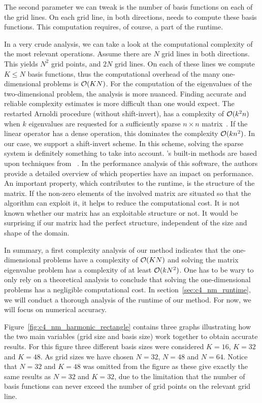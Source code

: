 The second parameter we can tweak is the number of basis functions on each of the grid lines. On each grid line, in both directions, \matslise{} needs to compute these basis functions. This computation requires, of course, a part of the runtime.

In a very crude analysis, we can take a look at the computational complexity of the most relevant operations. Assume there are $N$ grid lines in both directions. This yields $N^2$ grid points, and $2N$ grid lines. On each of these lines we compute $K \leq N$ basis functions, thus the computational overhead of the many one-dimensional problems is $\operatorname{\mathcal{O}}(K N)$. For the computation of the eigenvalues of the two-dimensional problem, the analysis is more nuanced. Finding accurate and reliable complexity estimates is more difficult than one would expect. The restarted Arnoldi procedure (without shift-invert), has a complexity of $\operatorname{\mathcal{O}}(k^2 n)$ when $k$ eigenvalues are requested for a sufficiently sparse $n \times n$ matrix~\cite{lee_k2n_2009}. If the linear operator has a dense operation, this dominates the complexity $\operatorname{\mathcal{O}}(k n^2)$. In our case, we support a shift-invert scheme. In this scheme, solving the sparse system is definitely something to take into account. \Eigen{}'s built-in methods are based upon techniques from \superlu{}~\cite{demmel_supernodal_1999,li_overview_2005}. In the performance analysis of this software, the authors provide a detailed overview of which properties have an impact on performance. An important property, which contributes to the runtime, is the structure of the matrix. If the non-zero elements of the involved matrix are situated so that the algorithm can exploit it, it helps to reduce the computational cost. It is not known whether our matrix has an exploitable structure or not. It would be surprising if our matrix had the perfect structure, independent of the size and shape of the domain.

In summary, a first complexity analysis of our method indicates that the one-dimensional problems have a complexity of $\operatorname{\mathcal{O}}(K N)$ and solving the matrix eigenvalue problem has a complexity of at least $\operatorname{\mathcal{O}}(k N^2)$. One has to be wary to only rely on a theoretical analysis to conclude that solving the one-dimensional problems has a negligible computational cost. In section~\ref{sec:c4_nm_runtime}, we will conduct a thorough analysis of the runtime of our method. For now, we will focus on numerical accuracy.

Figure~\ref{fig:c4_nm_harmonic_rectangle} contains three graphs illustrating how the two main variables (grid size and basis size) work together to obtain accurate results. For this figure three different basis sizes were considered $K = 16$, $K = 32$ and $K = 48$. As grid sizes we have chosen $N = 32$, $N = 48$ and $N=64$. Notice that $N = 32$ and $K = 48$ was omitted from the figure as these give exactly the same results as $N = 32$ and $K = 32$, due to the limitation that the number of basis functions can never exceed the number of grid points on the relevant grid line.

